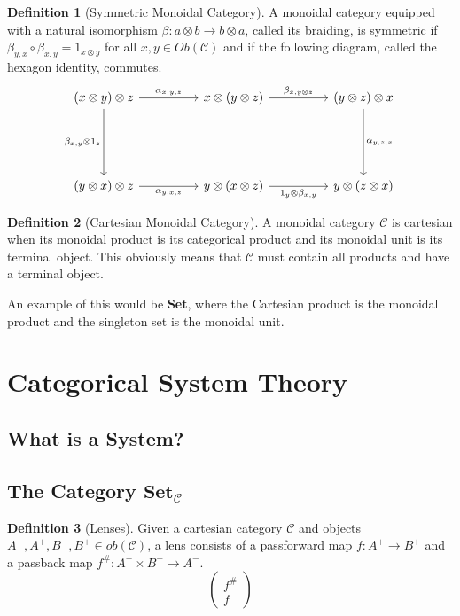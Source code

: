 \documentclass{article}
\theoremstyle{definition}
\newtheorem{definition}{Definition}
\begin{document}
\color{blue}
\begin{definition}[Symmetric Monoidal Category]
    A monoidal category equipped with a natural isomorphism $\beta:a\otimes b\rightarrow b\otimes a$, called its braiding, is symmetric if $\beta_{y,x}\circ\beta_{x,y}=1_{x\otimes y}$ for all $x,y\in Ob(\mathcal{C})$
    and if the following diagram, called the hexagon identity, commutes.
    \[\begin{tikzcd}
            {(x\otimes y)\otimes z} && {x \otimes (y \otimes z)} && {(y\otimes z)\otimes x} \\
            \\
            \\
            {(y\otimes x)\otimes z} && {y\otimes (x\otimes z)} && {y\otimes (z\otimes x)}
            \arrow["{\alpha_{x,y,z}}", from=1-1, to=1-3]
            \arrow["{\beta_{x,y\otimes z}}", from=1-3, to=1-5]
            \arrow["{\alpha_{y,z,x}}", from=1-5, to=4-5]
            \arrow["{\beta_{x,y}\otimes 1_z}"', from=1-1, to=4-1]
            \arrow["{\alpha_{y,x,z}}"', from=4-1, to=4-3]
            \arrow["{1_y \otimes \beta_{x,y}}"', from=4-3, to=4-5]
        \end{tikzcd}\]
\end{definition}

\begin{definition}[Cartesian Monoidal Category]
    A monoidal category $\mathcal{C}$ is cartesian when its monoidal product is its categorical product and its monoidal unit is its terminal object.
    This obviously means that $\mathcal{C}$ must contain all products and have a terminal object.
\end{definition}
An example of this would be \textbf{Set}, where the Cartesian product is the monoidal product and the singleton set is the monoidal unit.

\section*{Categorical System Theory}
\subsection*{What is a System?}
\subsection*{The Category $\textbf{Set}_{\mathcal{C}}$}

\begin{definition}[Lenses]
    Given a cartesian category $\mathcal{C}$ and objects $A^-, A^+, B^-, B^+ \in ob(\mathcal{C})$, a lens consists of a passforward map $f:A^+\rightarrow B^+$ and a passback map $f^\#:A^+ \times B^- \rightarrow A^-$.
    \[
        \begin{pmatrix}
            f^\# \\ f
        \end{pmatrix}
    \]
\end{definition}
\color{black}



\nocite{*}

\pagebreak



\end{document}
